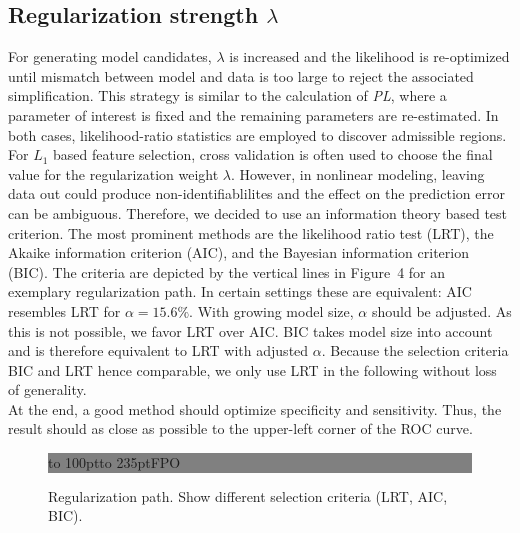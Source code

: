 \documentclass{bioinfo}
\begin{document}
\subsection{Regularization strength $\lambda$}
For generating model candidates, $\lambda$ is increased and the likelihood is re-optimized until mismatch between model and data is too large to reject the associated simplification.
This strategy is similar to the calculation of \emph{PL}, where a parameter of interest is fixed and the remaining parameters are re-estimated.
In both cases, likelihood-ratio statistics are employed to discover admissible regions.
For $L_1$ based feature selection, cross validation is often used to choose the final value for the regularization weight $\lambda$.
However, in nonlinear modeling, leaving data out could produce non-identifiablilites and the effect on the prediction error can be ambiguous.
Therefore, we decided to use an information theory based test criterion.
The most prominent methods are the likelihood ratio test (LRT), the Akaike information criterion (AIC), and the Bayesian information criterion (BIC).
The criteria are depicted by the vertical lines in Figure~4\vphantom{\ref{fig:04}} for an exemplary regularization path.
In certain settings these are equivalent: AIC resembles LRT for $\alpha = 15.6\%$.
With growing model size, $\alpha$ should be adjusted.
As this is not possible, we favor LRT over AIC.
BIC takes model size into account and is therefore equivalent to LRT with adjusted $\alpha$.
Because the selection criteria BIC and LRT hence comparable, we only use LRT in the following without loss of generality.\\
At the end, a good method should optimize specificity and sensitivity.
Thus, the result should as close as possible to the upper-left corner of the ROC curve.

\begin{figure}[!tpb]%
\fboxsep=0pt\colorbox{gray}{\begin{minipage}[t]{235pt} \vbox to 100pt{\vfill\hbox to
235pt{\hfill\fontsize{24pt}{24pt}\selectfont FPO\hfill}\vfill}
\end{minipage}}
\caption{Regularization path. Show different selection criteria (LRT, AIC, BIC).}\label{fig:04}
\end{figure}

\end{document}
